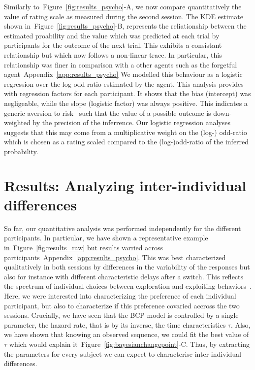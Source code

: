 \documentclass[profile,final,english,draft]{article}%
\newcommand{\citep}[1]{\parencite{#1}}
\newcommand{\seeFig}[1]{Figure~\ref{fig:#1}}
\newcommand{\seeApp}[1]{Appendix~\ref{app:#1}}
\begin{document}
Similarly to~\seeFig{results_psycho}-A,
we now compare quantitatively the value of rating scale
as measured during the second session.
The KDE estimate shown in~\seeFig{results_psycho}-B,
represents the reliationship between
the estimated proability
and the value which was predicted at each trial
by participants for the outcome of the next trial.
This exhibits a consistant relationship
but which now follows a non-linear trace.
In particular, this relationship was finer
in comparison with a other agents
such as the forgetful agent~\seeApp{results_psycho}
We modelled this behaviour as
a logistic regression over
the log-odd ratio estimated by the agent.
This analysis provides with regression factors for each participant.
It shows that the bias (intercept)
was negligeable, while the slope (logistic factor)
was always positive.
This indicates a generic aversion to risk~\citep{KanehmanXX}
such that the value of a possible outcome
is down-weighted by the precision of the inferrence.
Our logistic regression analyses
suggests that this may come from a multiplicative weight
on the (log-) odd-ratio which is chosen as a rating scaled
compared to the (log-)odd-ratio of the inferred probability.

\section{Results: Analyzing inter-individual differences}
\label{sec:inter}
So far, our quantitative analysis was performed independently
for the different participants.
In particular, we have shown a representative example in~\seeFig{results_raw}
but results varried across participants~\seeApp{results_psycho}.
This was best characterized qualitatively in both sessions by differences
in the variability of the responses but also for instance
with different characteristic delays after a switch.
This reflects the spectrum of individual choices
between exploration and exploiting behaviors~\citep{Behrens?}.
Here, we were interested into characterizing the preference
of each individual participant, but also to characterize
if this preference covaried accross the two sessions.
Crucially, we have seen that the BCP model is controlled by a single parameter,
the hazard rate, that is by its inverse, the time characteristics $\tau$.
Also, we have shown that knowing an observed sequence,
we could fit the best value of $\tau$ which would explain it~\seeFig{bayesianchangepoint}-C.
Thus, by extracting the parameters for every subject
we can expect to characterise inter individual differences.
\end{document}
